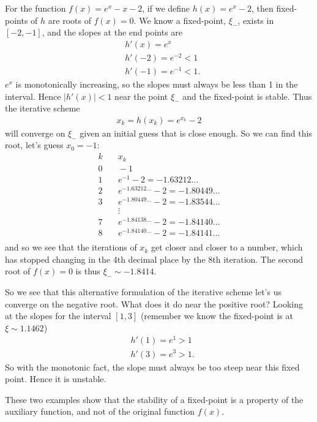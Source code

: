 \exemple{\upline}
	{	
	For the function $f(x) = e^x - x - 2$, if we define $h(x)=e^x - 2$, then fixed-points of $h$ are roots of $f(x)=0$. We know a fixed-point, $\xi_-$, exists in $[-2,-1]$, and the slopes at the end points are
	\begin{align*}
	& h'(x) = e^x \\
	& h'(-2) = e^{-2} < 1 \\
	& h'(-1) = e^{-1} < 1.
	\end{align*}
	$e^x$ is monotonically increasing, so the slopes must always be less than 1 in the interval. Hence $|h'(x)|<1$ near the point $\xi_-$ and the fixed-point is stable. Thus the iterative scheme
	\begin{align*}
	x_k = h(x_k) = e^{x_k} - 2
	\end{align*}
	will converge on $\xi_-$ given an initial guess that is close enough. So we can find this root, let's guess $x_0=-1$:
	\begin{align*}
	k  & \quad x_k \\
	0  & \quad -1 \\
	1  & \quad  e^{-1} - 2 = -1.63212\dots \\
	2  & \quad  e^{-1.63212\dots} - 2 = -1.80449\dots \\
	3  & \quad  e^{-1.80449\dots} - 2 = -1.83544\dots \\
	   & \quad \vdots \\
	7  & \quad  e^{-1.84138\dots} - 2 = -1.84140\dots \\
	8  & \quad  e^{-1.84140\dots} - 2 = -1.84141\dots \\
	\end{align*}
	and so we see that the iterations of $x_k$ get closer and closer to a number, which has stopped changing in the 4th decimal place by the 8th iteration. The second root of $f(x)=0$ is thus $\xi_- \sim -1.8414$.
	
	So we see that this alternative formulation of the iterative scheme let's us converge on the negative root. What does it do near the positive root? Looking at the slopes for the interval $[1,3]$ (remember we know the fixed-point is at $\xi \sim 1.1462$)
	\begin{align*}
	& h'(1) = e^{1} > 1 \\
	& h'(3) = e^{3} > 1.
	\end{align*}
	So with the monotonic fact, the slope must always be too steep near this fixed point. Hence it is unstable.
	}
{\downline}

These two examples show that the stability of a fixed-point is a property of the auxiliary function, and not of the original function $f(x)$. 



